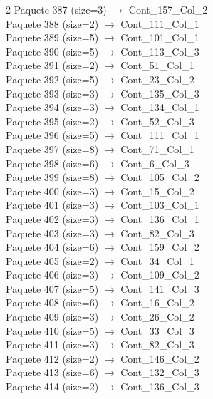 \begin{multicols}{2}
Paquete 387 (size=3) $\rightarrow$ Cont\_157\_Col\_2\\
Paquete 388 (size=2) $\rightarrow$ Cont\_111\_Col\_1\\
Paquete 389 (size=5) $\rightarrow$ Cont\_101\_Col\_1\\
Paquete 390 (size=5) $\rightarrow$ Cont\_113\_Col\_3\\
Paquete 391 (size=2) $\rightarrow$ Cont\_51\_Col\_1\\
Paquete 392 (size=5) $\rightarrow$ Cont\_23\_Col\_2\\
Paquete 393 (size=3) $\rightarrow$ Cont\_135\_Col\_3\\
Paquete 394 (size=3) $\rightarrow$ Cont\_134\_Col\_1\\
Paquete 395 (size=2) $\rightarrow$ Cont\_52\_Col\_3\\
Paquete 396 (size=5) $\rightarrow$ Cont\_111\_Col\_1\\
Paquete 397 (size=8) $\rightarrow$ Cont\_71\_Col\_1\\
Paquete 398 (size=6) $\rightarrow$ Cont\_6\_Col\_3\\
Paquete 399 (size=8) $\rightarrow$ Cont\_105\_Col\_2\\
Paquete 400 (size=3) $\rightarrow$ Cont\_15\_Col\_2\\
Paquete 401 (size=3) $\rightarrow$ Cont\_103\_Col\_1\\
Paquete 402 (size=3) $\rightarrow$ Cont\_136\_Col\_1\\
Paquete 403 (size=3) $\rightarrow$ Cont\_82\_Col\_3\\
Paquete 404 (size=6) $\rightarrow$ Cont\_159\_Col\_2\\
Paquete 405 (size=2) $\rightarrow$ Cont\_34\_Col\_1\\
Paquete 406 (size=3) $\rightarrow$ Cont\_109\_Col\_2\\
Paquete 407 (size=5) $\rightarrow$ Cont\_141\_Col\_3\\
Paquete 408 (size=6) $\rightarrow$ Cont\_16\_Col\_2\\
Paquete 409 (size=3) $\rightarrow$ Cont\_26\_Col\_2\\
Paquete 410 (size=5) $\rightarrow$ Cont\_33\_Col\_3\\
Paquete 411 (size=3) $\rightarrow$ Cont\_82\_Col\_3\\
Paquete 412 (size=2) $\rightarrow$ Cont\_146\_Col\_2\\
Paquete 413 (size=6) $\rightarrow$ Cont\_132\_Col\_3\\
Paquete 414 (size=2) $\rightarrow$ Cont\_136\_Col\_3\\

\end{multicols}
